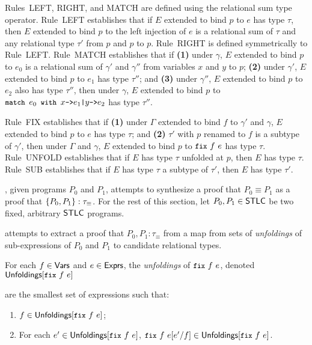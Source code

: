 Rules~LEFT, RIGHT, and MATCH are defined using the relational sum type
operator.
Rule~LEFT establishes that if $E$ extended to bind $p$ to $e$ has type
$\tau$, then $E$ extended to bind $p$ to the left injection of $e$ is
a relational sum of $\tau$ and any relational type $\tau'$ from $p$
and $p$ to $p$.
%
Rule~RIGHT is defined symmetrically to Rule~LEFT.
Rule~MATCH establishes that if %
\textbf{(1)} under $\gamma$, $E$ extended to bind $p$ to $e_0$ is a
relational sum of $\gamma'$ and $\gamma''$ from variables $x$ and $y$
to $p$;
% 
\textbf{(2)} under $\gamma'$, $E$ extended to bind $p$ to $e_1$ has
type $\tau''$; and
%
\textbf{(3)} under $\gamma''$, $E$ extended to bind $p$ to $e_2$ also
has type $\tau''$, then under $\gamma$, $E$ extended to bind $p$ to
$\matchexp{e_0}{x}{e_1}{y}{e_2}$ has type $\tau''$.

Rule~FIX establishes that if %
\textbf{(1)} under $\Gamma$ extended to bind $f$ to $\gamma'$ and
$\gamma$, $E$ extended to bind $p$ to $e$ has type $\tau$; and %
\textbf{(2)} $\tau'$ with $p$ renamed to $f$ is a subtype of
$\gamma'$, then under $\Gamma$ and $\gamma$, $E$ extended to bind $p$
to $\fix{f}{e}$ has type $\tau$.
Rule~UNFOLD establishes that if $E$ has type $\tau$ unfolded at $p$,
then $E$ has type $\tau$.
Rule~SUB establishes that if $E$ has type $\tau$ a subtype of $\tau'$,
then $E$ has type $\tau'$.


% 
\sys, given programs $P_0$ and $P_1$, attempts to synthesize a proof
that $P_0 \equiv P_1$ as a proof that $\{  P_0, P_1  \} :
\tau_{\equiv}$.
%
For the rest of this section, let $P_0, P_1 \in \mathsf{STLC}$ be two fixed,
arbitrary $\mathsf{STLC}$ programs.

\sys attempts to extract a proof that $P_0, P_1 : \tau_{\equiv}$ from
a map from sets of \emph{unfoldings} of sub-expressions of $P_0$
and $P_1$ to candidate relational types.
%
\begin{defn}
  \label{defn:unfoldings}
  For each $f \in \mathsf{Vars}$ and $e \in \mathsf{Exprs}$, the \emph{unfoldings} of
  $\fix{f}{e}$, denoted $\unfoldings{ \fix{f}{e} }$

 are the smallest set of expressions such that:
  \begin{enumerate}
  \item $f \in \unfoldings{ \fix{f}{e} }$;
  \item For each $e' \in \unfoldings{ \fix{f}{e} }$, $\replace{
      \fix{f}{e} }{ f }{ e' } \in \unfoldings{ \fix{f}{e} }$.
  \end{enumerate}
\end{defn}
%
%


